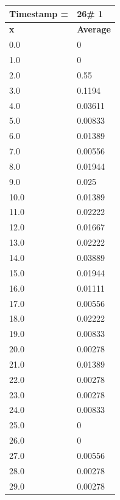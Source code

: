 \begin{tabular}{|l||l|}
\hline
\textbf{Timestamp =} & \textbf{26}\# 1\\\hline
	\textbf{x} & \textbf{Average} \\ \hline
\hline
	0.0 & 0 \\ \hline
	1.0 & 0 \\ \hline
	2.0 & 0.55 \\ \hline
	3.0 & 0.1194 \\ \hline
	4.0 & 0.03611 \\ \hline
	5.0 & 0.00833 \\ \hline
	6.0 & 0.01389 \\ \hline
	7.0 & 0.00556 \\ \hline
	8.0 & 0.01944 \\ \hline
	9.0 & 0.025 \\ \hline
	10.0 & 0.01389 \\ \hline
	11.0 & 0.02222 \\ \hline
	12.0 & 0.01667 \\ \hline
	13.0 & 0.02222 \\ \hline
	14.0 & 0.03889 \\ \hline
	15.0 & 0.01944 \\ \hline
	16.0 & 0.01111 \\ \hline
	17.0 & 0.00556 \\ \hline
	18.0 & 0.02222 \\ \hline
	19.0 & 0.00833 \\ \hline
	20.0 & 0.00278 \\ \hline
	21.0 & 0.01389 \\ \hline
	22.0 & 0.00278 \\ \hline
	23.0 & 0.00278 \\ \hline
	24.0 & 0.00833 \\ \hline
	25.0 & 0 \\ \hline
	26.0 & 0 \\ \hline
	27.0 & 0.00556 \\ \hline
	28.0 & 0.00278 \\ \hline
	29.0 & 0.00278 \\ \hline
\end{tabular}
